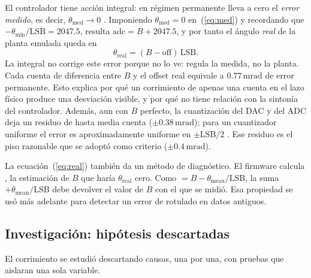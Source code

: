 \documentclass[12pt,letterpaper]{article}
\newcommand{\cod}[1]{\texttt{\detokenize{#1}}}
\newcommand{\mrad}{\,\mathrm{mrad}}
\begin{document}
El controlador tiene acción integral: en régimen permanente lleva a cero el \textit{error medido}, es decir, $\theta_{\mathrm{med}}\to 0$ \cite{astrom}. Imponiendo $\theta_{\mathrm{med}}=0$ en~(\ref{eq:med}) y recordando que $-\theta_{\min}/\mathrm{LSB}=2047.5$, resulta $\mathrm{adc}=B+2047.5$, y por tanto el ángulo \textit{real} de la planta emulada queda en
\begin{equation}
\theta_{\mathrm{real}}=(B-\mathrm{off})\,\mathrm{LSB}.
\label{eq:real}
\end{equation}
La integral no corrige este error porque no lo ve: regula la medida, no la planta. Cada cuenta de diferencia entre $B$ y el offset real equivale a $0.77\mrad$ de error permanente. Esto explica por qué un corrimiento de apenas una cuenta en el lazo físico produce una desviación visible, y por qué no tiene relación con la sintonía del controlador. Además, aun con $B$ perfecto, la cuantización del DAC y del ADC deja un residuo de hasta media cuenta ($\pm 0.38\mrad$); para un cuantizador uniforme el error es aproximadamente uniforme en $\pm \mathrm{LSB}/2$ \cite{oppenheim}. Ese residuo es el piso razonable que se adoptó como criterio ($\pm 0.4\mrad$).

La ecuación~(\ref{eq:real}) también da un método de diagnóstico. El firmware calcula \cod{b_sugerido}, la estimación de $B$ que haría $\theta_{\mathrm{real}}$ cero. Como \cod{b_sugerido} $=B-\theta_{\mathrm{mean}}/\mathrm{LSB}$, la suma \cod{b_sugerido} $+\theta_{\mathrm{mean}}/\mathrm{LSB}$ debe devolver el valor de $B$ con el que se midió. Esa propiedad se usó más adelante para detectar un error de rotulado en datos antiguos.

\subsection{Investigación: hipótesis descartadas}

El corrimiento se estudió descartando causas, una por una, con pruebas que aislaran una sola variable.
\end{document}
